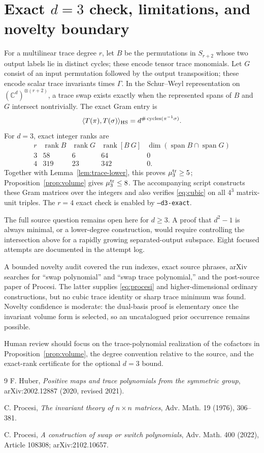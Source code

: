 \documentclass[11pt]{article}
\begin{document}
\section{Exact $d=3$ check, limitations, and novelty boundary}

For a multilinear trace degree $r$, let $B$ be the permutations in
$S_{r+2}$ whose two output labels lie in distinct cycles; these encode tensor
trace monomials.  Let $G$ consist of an input permutation followed by the
output transposition; these encode scalar trace invariants times $\Gamma$.
In the Schur--Weyl representation on $(\mathbb C^d)^{\otimes(r+2)}$, a trace
swap exists exactly when the represented spans of $B$ and $G$ intersect
nontrivially.  The exact Gram entry is
\[
 \langle T(\pi),T(\sigma)\rangle_{\rm HS}
 =d^{\#\operatorname{cycles}(\pi^{-1}\sigma)}.
\]
For $d=3$, exact integer ranks are
\[
\begin{array}{c|ccc|c}
r&\operatorname{rank}B&\operatorname{rank}G&
\operatorname{rank}[B\ G]&\dim(\operatorname{span}B\cap\operatorname{span}G)\\
\hline
3&58&6&64&0\\
4&319&23&342&0.
\end{array}
\]
Together with Lemma~\ref{lem:trace-lower}, this proves
$\mu_3^{\rm tr}\ge5$; Proposition~\ref{prop:volume} gives
$\mu_3^{\rm tr}\le8$.  The accompanying script constructs these Gram
matrices over the integers and also verifies \eqref{eq:cubic} on all $4^3$
matrix-unit triples.  The $r=4$ exact check is enabled by
\texttt{--d3-exact}.

The full source question remains open here for $d\ge3$.  A proof that
$d^2-1$ is always minimal, or a lower-degree construction, would require
controlling the intersection above for a rapidly growing separated-output
subspace.  Eight focused attempts are documented in the attempt log.

A bounded novelty audit covered the run indexes, exact source phrases, arXiv
searches for ``swap polynomial'' and ``swap trace polynomial,'' and the
post-source paper of Procesi.  The latter supplies \eqref{eq:procesi} and
higher-dimensional ordinary constructions, but no cubic trace identity or
sharp trace minimum was found.  Novelty confidence is moderate: the
dual-basis proof is elementary once the invariant volume form is selected,
so an uncatalogued prior occurrence remains possible.

Human review should focus on the trace-polynomial realization of the
cofactors in Proposition~\ref{prop:volume}, the degree convention relative to
the source, and the exact-rank certificate for the optional $d=3$ bound.

\enlargethispage{3\baselineskip}
\small
\begin{thebibliography}{9}
F. Huber,
\emph{Positive maps and trace polynomials from the symmetric group},
arXiv:2002.12887 (2020, revised 2021).

C. Procesi,
\emph{The invariant theory of $n\times n$ matrices},
Adv. Math. 19 (1976), 306--381.

C. Procesi,
\emph{A construction of swap or switch polynomials},
Adv. Math. 400 (2022), Article 108308; arXiv:2102.10657.
\end{thebibliography}
\end{document}
